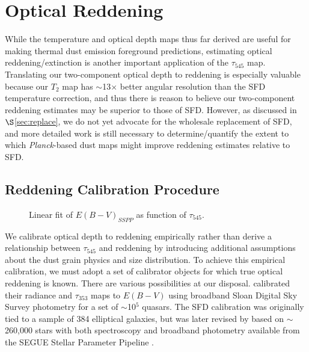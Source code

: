 \documentclass{emulateapj}
\newcommand{\PLANCK}{{\it Planck}}
\begin{document}


\section{Optical Reddening}
\label{sec:ebv}

While the temperature and optical depth maps thus far derived are
useful for making thermal dust emission foreground predictions, estimating 
optical reddening/extinction is another important application of the 
$\tau_{545}$ map. Translating our two-component optical depth to reddening
is especially valuable because our $T_2$ map has $\sim$13$\times$ better
angular resolution than the SFD temperature correction, and thus there is 
reason to believe our two-component reddening estimates may be superior to
those of SFD. However, as discussed in $\S$\ref{sec:replace}, we do not yet 
advocate for the wholesale replacement of SFD, and more detailed work is still 
necessary to determine/quantify the extent to which \PLANCK-based dust maps
might improve reddening estimates relative to SFD.


\subsection{Reddening Calibration Procedure}

\begin{figure}
\begin{center}
\caption{\label{fig:calib} Linear fit of $E(B-V)_{SSPP}$ as function of
$\tau_{545}$.}
\end{center}
\end{figure}

We calibrate optical depth to reddening empirically rather than derive a 
relationship between $\tau_{545}$ and reddening by introducing additional 
assumptions about the dust grain physics and size distribution. To achieve this
empirical calibration, we must adopt a set of calibrator objects for which true
optical reddening is known. There are various possibilities at our disposal. 
\cite{planckdust} calibrated their radiance and $\tau_{353}$ maps to $E(B-V)$ 
using broadband Sloan Digital Sky Survey \citep[SDSS;][]{sdss} photometry for a
set of $\sim$10$^5$ quasars. The SFD calibration was originally tied to a 
sample of 384 elliptical galaxies, but was later revised by 
\citet[hereafter SF11]{schlafly11} based on $\sim$260,000 stars with both 
spectroscopy and broadband photometry available from the SEGUE Stellar 
Parameter Pipeline \citep[SSPP,][]{sspp}.
\end{document}
